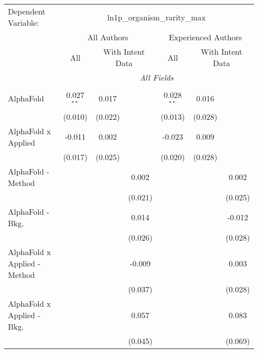 \begingroup
\centering
\begin{tabular}{lcccccc}
   \tabularnewline \midrule \midrule
   Dependent Variable: & \multicolumn{6}{c}{ln1p\_organism\_rarity\_max}\\
 & \multicolumn{3}{c}{All Authors} & \multicolumn{3}{c}{Experienced Authors} \\
\cmidrule(lr){2-4} \cmidrule(lr){5-7}
 & \multicolumn{1}{c}{All} & \multicolumn{2}{c}{With Intent Data} & \multicolumn{1}{c}{All} & \multicolumn{2}{c}{With Intent Data} \\
\cmidrule(lr){2-2} \cmidrule(lr){3-4} \cmidrule(lr){5-5} \cmidrule(lr){6-7}
 & \multicolumn{6}{c}{\textit{All Fields}} \\ \\
   AlphaFold                      & 0.027$^{**}$ & 0.017        &               & 0.028$^{**}$ & 0.016        &   \\   
                                  & (0.010)      & (0.022)      &               & (0.013)      & (0.028)      &   \\   
   AlphaFold x Applied            & -0.011       & 0.002        &               & -0.023       & 0.009        &   \\   
                                  & (0.017)      & (0.025)      &               & (0.020)      & (0.028)      &   \\   
   AlphaFold - Method             &              &              & 0.002         &              &              & 0.002\\   
                                  &              &              & (0.021)       &              &              & (0.025)\\   
   AlphaFold - Bkg.               &              &              & 0.014         &              &              & -0.012\\   
                                  &              &              & (0.026)       &              &              & (0.028)\\   
   AlphaFold x Applied - Method   &              &              & -0.009        &              &              & 0.003\\   
                                  &              &              & (0.037)       &              &              & (0.028)\\   
   AlphaFold x Applied - Bkg.     &              &              & 0.057         &              &              & 0.083\\   
                                  &              &              & (0.045)       &              &              & (0.069)\\   

\end{tabular}

